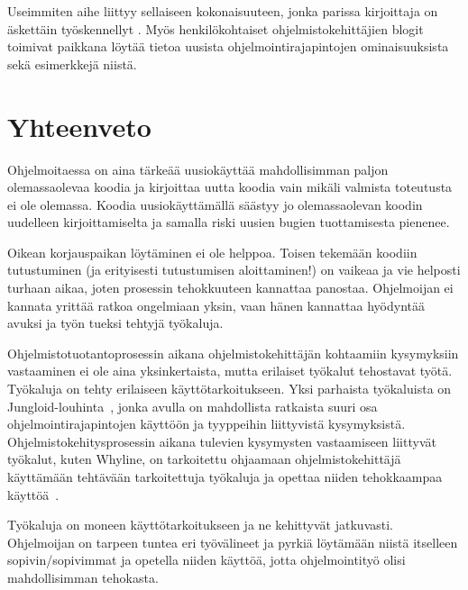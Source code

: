 \documentclass[finnish]{tktltiki2}
\theoremstyle{definition}
\theoremstyle{remark}
\begin{document}
Useimmiten aihe liittyy sellaiseen kokonaisuuteen, jonka parissa kirjoittaja on äskettäin työskennellyt \cite{how-dev-blog}.
Myös henkilökohtaiset ohjelmistokehittäjien blogit toimivat paikkana löytää tietoa uusista ohjelmointirajapintojen ominaisuuksista sekä esimerkkejä niistä.

\section{Yhteenveto}
Ohjelmoitaessa on aina tärkeää uusiokäyttää mahdollisimman paljon olemassaolevaa koodia ja kirjoittaa uutta koodia vain mikäli valmista toteutusta ei ole olemassa. Koodia uusiokäyttämällä säästyy jo olemassaolevan koodin uudelleen kirjoittamiselta ja samalla riski uusien bugien tuottamisesta pienenee.

Oikean korjauspaikan löytäminen ei ole helppoa. Toisen tekemään koodiin tutustuminen (ja erityisesti tutustumisen aloittaminen!) on vaikeaa ja vie helposti turhaan aikaa, joten prosessin tehokkuuteen kannattaa panostaa. Ohjelmoijan ei kannata yrittää ratkoa ongelmiaan yksin, vaan hänen kannattaa hyödyntää avuksi ja työn tueksi tehtyjä työkaluja.

Ohjelmistotuotantoprosessin aikana ohjelmistokehittäjän kohtaamiin kysymyksiin vastaaminen ei ole aina yksinkertaista, mutta erilaiset työkalut tehostavat työtä. Työkaluja on tehty erilaiseen käyttötarkoitukseen. Yksi parhaista työkaluista on Jungloid-louhinta~\cite{jungloid-mining}, jonka avulla on mahdollista ratkaista suuri osa ohjelmointirajapintojen käyttöön ja tyyppeihin liittyvistä kysymyksistä. Ohjelmistokehitysprosessin aikana tulevien kysymysten vastaamiseen liittyvät työkalut, kuten Whyline, on tarkoitettu ohjaamaan ohjelmistokehittäjä käyttämään tehtävään tarkoitettuja työkaluja ja opettaa niiden tehokkaampaa käyttöä~\cite{whyline}.

Työkaluja on moneen käyttötarkoitukseen ja ne kehittyvät jatkuvasti. Ohjelmoijan on tarpeen tuntea eri työvälineet ja pyrkiä löytämään niistä itselleen sopivin/sopivimmat ja opetella niiden käyttöä, jotta ohjelmointityö olisi mahdollisimman tehokasta.

\newpage


\end{document}
